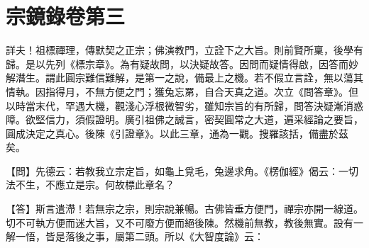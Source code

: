 
% 

\chapter{宗鏡錄卷第三}

詳夫！祖標禪理，傳默契之正宗；佛演教門，立詮下之大旨。則前賢所稟，後學有歸。是以先列《標宗章》。為有疑故問，以決疑故答。因問而疑情得啟，因答而妙解潛生。謂此圓宗難信難解，是第一之說，備最上之機。若不假立言詮，無以蕩其情執。因指得月，不無方便之門；獲兔忘罤，自合天真之道。次立《問答章》。但以時當末代，罕遇大機，觀淺心浮根微智劣，雖知宗旨的有所歸，問答決疑漸消惑障。欲堅信力，須假證明。廣引祖佛之誠言，密契圓常之大道，遍采經論之要旨，圓成決定之真心。後陳《引證章》。以此三章，通為一觀。搜羅該括，備盡於茲矣。 


{\heiti 【問】先德云：若教我立宗定旨，如龜上覓毛，兔邊求角。《楞伽經》偈云：一切法不生，不應立是宗。何故標此章名？}

【答】斯言遣滯！若無宗之宗，則宗說兼暢。古佛皆垂方便門，禪宗亦開一線道。切不可執方便而迷大旨，又不可廢方便而絕後陳。然機前無教，教後無實。設有一解一悟，皆是落後之事，屬第二頭。所以《大智度論》云：

